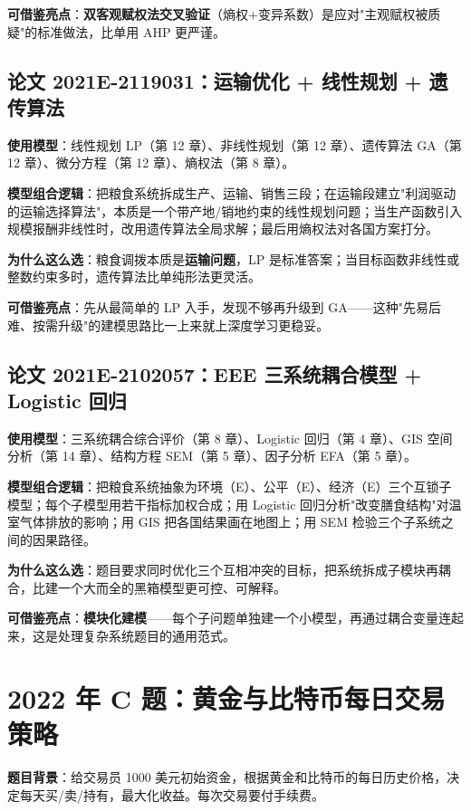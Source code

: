 \textbf{可借鉴亮点}：\textbf{双客观赋权法交叉验证}（熵权+变异系数）是应对"主观赋权被质疑"的标准做法，比单用 AHP 更严谨。

\subsection{论文 2021E-2119031：运输优化 + 线性规划 + 遗传算法}
\textbf{使用模型}：线性规划 LP（第 12 章）、非线性规划（第 12 章）、遗传算法 GA（第 12 章）、微分方程（第 12 章）、熵权法（第 8 章）。

\textbf{模型组合逻辑}：把粮食系统拆成生产、运输、销售三段；在运输段建立"利润驱动的运输选择算法"，本质是一个带产地/销地约束的线性规划问题；当生产函数引入规模报酬非线性时，改用遗传算法全局求解；最后用熵权法对各国方案打分。

\textbf{为什么这么选}：粮食调拨本质是\textbf{运输问题}，LP 是标准答案；当目标函数非线性或整数约束多时，遗传算法比单纯形法更灵活。

\textbf{可借鉴亮点}：先从最简单的 LP 入手，发现不够再升级到 GA——这种"先易后难、按需升级"的建模思路比一上来就上深度学习更稳妥。

\subsection{论文 2021E-2102057：EEE 三系统耦合模型 + Logistic 回归}
\textbf{使用模型}：三系统耦合综合评价（第 8 章）、Logistic 回归（第 4 章）、GIS 空间分析（第 14 章）、结构方程 SEM（第 5 章）、因子分析 EFA（第 5 章）。

\textbf{模型组合逻辑}：把粮食系统抽象为环境（E）、公平（E）、经济（E）三个互锁子模型；每个子模型用若干指标加权合成；用 Logistic 回归分析"改变膳食结构"对温室气体排放的影响；用 GIS 把各国结果画在地图上；用 SEM 检验三个子系统之间的因果路径。

\textbf{为什么这么选}：题目要求同时优化三个互相冲突的目标，把系统拆成子模块再耦合，比建一个大而全的黑箱模型更可控、可解释。

\textbf{可借鉴亮点}：\textbf{模块化建模}——每个子问题单独建一个小模型，再通过耦合变量连起来，这是处理复杂系统题目的通用范式。

\section{2022 年 C 题：黄金与比特币每日交易策略}

\textbf{题目背景}：给交易员 1000 美元初始资金，根据黄金和比特币的每日历史价格，决定每天买/卖/持有，最大化收益。每次交易要付手续费。

